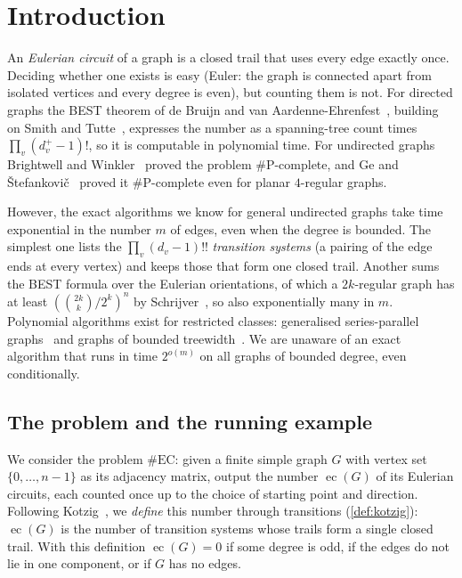 \documentclass[10pt]{amsart}
\theoremstyle{plain}
\theoremstyle{definition}
\theoremstyle{remark}
\numberwithin{equation}{section}
\newcommand{\EC}{\operatorname{ec}}
\begin{document}
\maketitle

\section{Introduction}\label{sec:intro}

An \emph{Eulerian circuit} of a graph is a closed trail that uses every edge exactly once. Deciding
whether one exists is easy (Euler: the graph is connected apart from isolated vertices and every
degree is even), but counting them is not. For directed graphs the BEST theorem of de Bruijn and van
Aardenne-Ehrenfest~\cite{BE51}, building on Smith and Tutte~\cite{ST41}, expresses the number as a
spanning-tree count times $\prod_v(d^+_v-1)!$, so it is computable in polynomial time. For undirected
graphs Brightwell and Winkler~\cite{BW05} proved the problem $\#$P-complete, and Ge and
\v{S}tefankovi\v{c}~\cite{GS10} proved it $\#$P-complete even for planar $4$-regular graphs.

However, the exact algorithms we know for general undirected graphs take time exponential in the
number $m$ of edges, even when the degree is bounded. The simplest one lists the
$\prod_v(d_v-1)!!$ \emph{transition systems} (a pairing of the edge ends at every vertex) and keeps
those that form one closed trail. Another sums the BEST formula over the Eulerian orientations,
of which a $2k$-regular graph has at least $(\binom{2k}{k}/2^k)^n$ by Schrijver~\cite{Sch83}, so also
exponentially many in $m$. Polynomial algorithms exist for restricted classes: generalised
series-parallel graphs~\cite{CCM12} and graphs of bounded treewidth~\cite{BDG15}. We are unaware of
an exact algorithm that runs in time $2^{o(m)}$ on all graphs of bounded degree, even conditionally.

\subsection{The problem and the running example}
We consider the problem $\#\mathrm{EC}$: given a finite simple graph $G$ with vertex set
$\{0,\dots,n-1\}$ as its adjacency matrix, output the number $\EC(G)$ of its Eulerian circuits,
each counted once up to the choice of starting point and direction. Following Kotzig~\cite{Kot68}, we
\emph{define} this number through transitions (\cref{def:kotzig}): $\EC(G)$ is the number of
transition systems whose trails form a single closed trail. With this definition $\EC(G)=0$ if some
degree is odd, if the edges do not lie in one component, or if $G$ has no edges.
\end{document}
